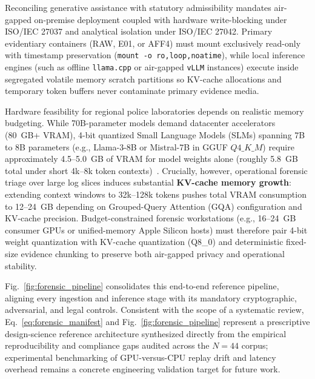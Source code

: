 Reconciling generative assistance with statutory admissibility mandates air-gapped on-premise deployment coupled with hardware write-blocking under ISO/IEC 27037 and analytical isolation under ISO/IEC 27042. Primary evidentiary containers (RAW, E01, or AFF4) must mount exclusively read-only with timestamp preservation (\texttt{mount -o ro,loop,noatime}), while local inference engines (such as offline \texttt{llama.cpp} or air-gapped \texttt{vLLM} instances) execute inside segregated volatile memory scratch partitions so KV-cache allocations and temporary token buffers never contaminate primary evidence media.

Hardware feasibility for regional police laboratories depends on realistic memory budgeting. While 70B-parameter models demand datacenter accelerators (80~GB+ VRAM), 4-bit quantized Small Language Models (SLMs) spanning 7B to 8B parameters (e.g., Llama-3-8B or Mistral-7B in GGUF $Q4\_K\_M$) require approximately 4.5--5.0~GB of VRAM for model weights alone (roughly 5.8~GB total under short 4k--8k token contexts)~\cite{sharma2025_forensicllm, michelet2025_finetuning}. Crucially, however, operational forensic triage over large log slices induces substantial \textbf{KV-cache memory growth}: extending context windows to 32k--128k tokens pushes total VRAM consumption to 12--24~GB depending on Grouped-Query Attention (GQA) configuration and KV-cache precision. Budget-constrained forensic workstations (e.g., 16--24~GB consumer GPUs or unified-memory Apple Silicon hosts) must therefore pair 4-bit weight quantization with KV-cache quantization (Q8\_0) and deterministic fixed-size evidence chunking to preserve both air-gapped privacy and operational stability.



Fig.~\ref{fig:forensic_pipeline} consolidates this end-to-end reference pipeline, aligning every ingestion and inference stage with its mandatory cryptographic, adversarial, and legal controls. Consistent with the scope of a systematic review, Eq.~\eqref{eq:forensic_manifest} and Fig.~\ref{fig:forensic_pipeline} represent a prescriptive design-science reference architecture synthesized directly from the empirical reproducibility and compliance gaps audited across the $N=44$ corpus; experimental benchmarking of GPU-versus-CPU replay drift and latency overhead remains a concrete engineering validation target for future work.
